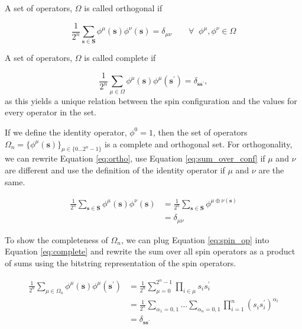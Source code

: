 \begin{definition}
    A set of operators, $\Omega$ is called orthogonal if

    \begin{equation}\label{eq:ortho}
        \frac{1}{2^n} \sum_{\mathbf{s} \in \mathbf{S}} \phi^\mu(\mathbf{s}) \phi^\nu(\mathbf{s}) = \delta_{\mu\nu} \qquad \forall \;\; \phi^\mu, \phi^\nu \in \Omega
    \end{equation}
\end{definition}

\begin{definition}
    A set of operators, $\Omega$ is called complete if

    \begin{equation}\label{eq:complete}
        \frac{1}{2^n} \sum_{\mu \in \Omega} \phi^\mu(\mathbf{s}) \phi^\mu(\mathbf{s}^\prime) = \delta_{\mathbf{s}\mathbf{s}^\prime},
    \end{equation}
    as this yields a unique relation between the spin configuration and the values for every operator in the set.
\end{definition}

\noindent
If we define the identity operator, $\phi^0 = 1$, then the set of operators $\Omega_n = \{\phi^\mu(\mathbf{s})\}_{\mu \in \{0 \dots 2^n-1\}}$ is a complete and orthogonal set.
For orthogonality, we can rewrite Equation \ref{eq:ortho}, use Equation \ref{eq:sum_over_conf} if $\mu$ and $\nu$ are different and use the definition of the identity operator if $\mu$ and $\nu$ are the same.

\begin{align*}
    \frac{1}{2^n} \sum_{\mathbf{s} \in \mathbf{S}} \phi^\mu(\mathbf{s}) \phi^\nu(\mathbf{s}) &= \frac{1}{2^n} \sum_{\mathbf{s} \in \mathbf{S}} \phi^{\mu \oplus \nu (\mathbf{s})}\\
    &= \delta_{\mu\nu}
\end{align*}

\noindent
To show the completeness of $\Omega_n$, we can plug Equation \ref{eq:spin_op} into Equation \ref{eq:complete} and rewrite the sum over all spin operators as a product of sums using the bitstring representation of the spin operators.

\begin{align*}
    \frac{1}{2^n} \sum_{\mu \in \Omega_n} \phi^\mu(\mathbf{s}) \phi^\mu(\mathbf{s}^\prime) &= \frac{1}{2^n} \sum_{\mu=0}^{2^n-1} \prod_{i \in \mu} s_i s_i^\prime \\
    &= \frac{1}{2^n} \sum_{\alpha_1 = 0,1} \dots \sum_{\alpha_n = 0,1} \prod_{i = 1}^{n} (s_i s_i^\prime)^{\alpha_i} \\
    &= \delta_{\mathbf{s}\mathbf{s}^\prime}
\end{align*}

